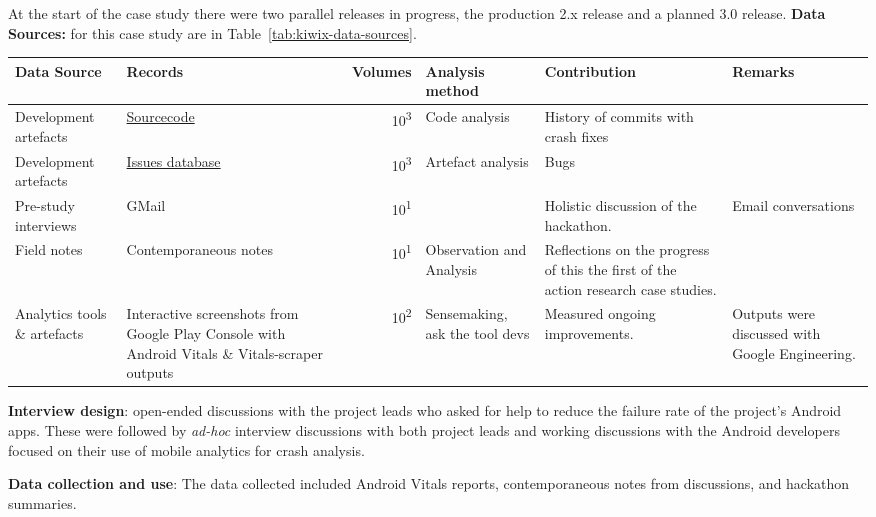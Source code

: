 At the start of the case study there were two parallel releases in progress, the production 2.x release and a planned 3.0 release.
%
\textbf{Data Sources:} for this case study are in Table~\ref{tab:kiwix-data-sources}.

\begin{table*}
    \centering
    \footnotesize
    \begin{tabular}{>{\raggedright}p{2cm} >{\raggedright}p{3.3cm} r >{\raggedright}p{2.1cm} >{\raggedright}p{2.2cm} >{\raggedright\arraybackslash}p{2.5cm}}
        Data Source & Records & Volumes & Analysis method & Contribution & Remarks \\
        \toprule
         Development artefacts & \href{https://github.com/kiwix/kiwix-android/tree/develop}{Sourcecode} & 10\textsuperscript{3} & Code analysis & History of commits with crash fixes &  \\
         Development artefacts & \href{https://github.com/kiwix/kiwix-android/issues}{Issues database} & 10\textsuperscript{3} & Artefact analysis & Bugs & \\
         Pre-study interviews & GMail & 10\textsuperscript{1} & & Holistic discussion of the hackathon. & Email conversations \\
         Field notes & Contemporaneous notes & 10\textsuperscript{1} & Observation and Analysis & Reflections on the progress of this the first of the action research case studies. & \\
         Analytics tools \& artefacts &Interactive screenshots from Google Play Console with Android Vitals \& Vitals-scraper outputs &10\textsuperscript{2} & Sensemaking, ask the tool devs & Measured ongoing improvements. & Outputs were discussed with Google Engineering. \\
         \bottomrule
    \end{tabular}
    \caption{Kiwix: data sources}
    \label{tab:kiwix-data-sources}
\end{table*}




\textbf{Interview design}: open-ended discussions with the project leads who asked for help to reduce the failure rate of the project's Android apps. These were followed by 
\emph{ad-hoc} interview discussions with both project leads and working discussions with the Android developers focused on their use of mobile analytics for crash analysis.

\textbf{Data collection and use}: 
The data collected included Android Vitals reports, contemporaneous notes from discussions, and hackathon summaries. 

